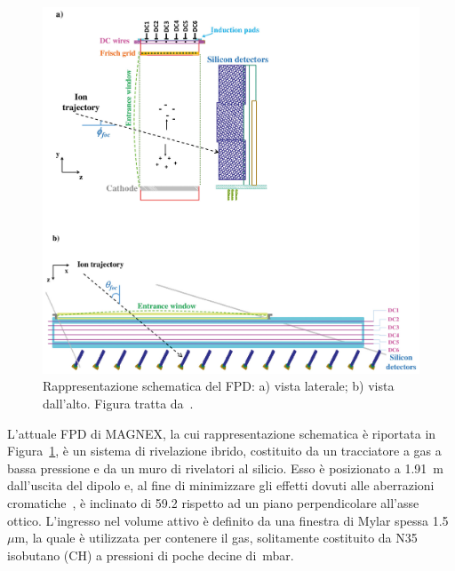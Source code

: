 

\subsection{} \label{sez:fpd}

\begin{figure} [!p]
	\centering
	\includegraphics[width=\textwidth, keepaspectratio]{Grafici/fpd.png}
	\caption{Rappresentazione schematica del FPD: a) vista laterale; b) vista dall'alto. Figura tratta da~\cite{cappuzzello:epja18}.} \label{fig:fpd}
\end{figure}


L'attuale FPD di MAGNEX, la cui rappresentazione schematica è riportata in Figura~\ref{fig:fpd}, è un sistema di rivelazione ibrido, costituito da un tracciatore a gas a bassa pressione e da un muro di rivelatori al silicio.
Esso è posizionato a 1.91~m dall'uscita del dipolo e, al fine di minimizzare gli effetti dovuti alle aberrazioni cromatiche~\cite{cunsolo:nima01}, è inclinato di 59.2\textdegree{} rispetto ad un piano perpendicolare all'asse ottico.
L'ingresso nel volume attivo è definito da una finestra di Mylar spessa 1.5~$\mu$m, la quale è utilizzata per contenere il gas, solitamente costituito da N35 isobutano (CH) a pressioni di poche decine di~mbar.




